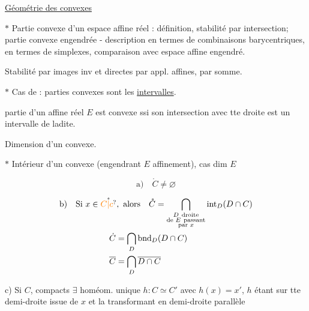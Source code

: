 
\uline{Géométrie des convexes}

$\ast$ Partie convexe d'un espace affine réel : définition, stabilité par intersection; partie convexe engendrée - description en termes de combinaisons barycentriques, en termes de simplexes, comparaison avec espace affine engendré.


Stabilité par images inv et directes par appl. affines, par somme.

$\ast$ Cas de  : parties convexes sont les \uline{intervalles}.

 partie  d'un  affine réel $E$ est convexe ssi son intersection avec tte droite est un intervalle de ladite.

Dimension d'un convexe.

$\ast$ Intérieur d'un convexe (engendrant $E$ affinement), cas dim $E$

\[
\text{a)}\quad \mathring C\ne\varnothing
\]

\[
\begin{aligned}
\text{b)}\quad &\text{Si }x\in\mathring{\unsure{C|c}},\ \text{alors}\quad
 \mathring C=\bigcap_{\substack{D\ \text{droite}\\\text{de }E\ \text{passant}\\\text{par }x}}\operatorname{int}_{D}(D\cap C)\\
&\hspace{4em}\dot C=\bigcap_D\operatorname{bnd}_D(D\cap C)\\
&\hspace{4em}\overline C=\bigcap_D\overline{D\cap C}
\end{aligned}
\]


c) Si $C$,  compacts\unsure{,|;}  $\exists$ homéom. unique $h:C\simeq C'$ avec $h(x)=x'$, $h$ étant  sur tte demi-droite issue de $x$ et la transformant en demi-droite parallèle


